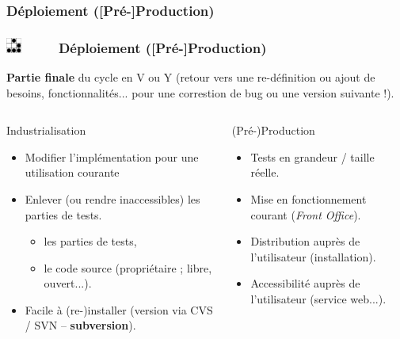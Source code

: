 \documentclass[slidetop,11pt]{beamer}
\def\sectionPartIaTR{D{\'e}ploiement ([Pr{\'e}-]Production)}
\def\moreInFrameTitle{\includegraphics[height=0.5cm]{img/logo_glider.png}~~~~~}
\begin{document}
\subsubsection{\sectionPartIaTR}
\begin{frame}
	\frametitle{\moreInFrameTitle \sectionPartIaTR}
	\textbf{Partie finale} du cycle en V ou Y (retour vers une re-d{\'e}finition ou ajout de besoins, fonctionnalit{\'e}s... pour une correstion de bug ou une version suivante !). 
	
	\begin{columns}[c]
	\begin{column}[c]{6cm}
		\begin{beamerboxesrounded}	[lower=substructureTR, %
		 				 upper=block title TR,%
						 shadow=true]%
		       {Industrialisation}
		        \begin{itemize}
				\item Modifier l'impl{\'e}mentation pour une utilisation courante
				\item Enlever (ou rendre inaccessibles) les parties de tests. 
				\begin{itemize}
					\item les parties de tests, 
					\item le code source (propri{\'e}taire ; libre, ouvert...). 
				\end{itemize}
				\item Facile {\`a} (re-)installer (version via CVS / SVN -- \textbf{subversion}). 
			\end{itemize}
		 \end{beamerboxesrounded}
	\end{column}
	\begin{column}[c]{6cm}
		 \begin{beamerboxesrounded}	[lower=substructureDE, %
		 				 upper=block title DE,%
						 shadow=true]%
		       {(Pr{\'e}-)Production}
		        \begin{itemize}
				\item Tests en grandeur / taille r{\'e}elle. 
				\item Mise en fonctionnement courant (\emph{Front Office}). 
				\item Distribution aupr{\`e}s de l'utilisateur (installation). 
				\item Accessibilit{\'e} aupr{\`e}s de l'utilisateur (service web...). 
			\end{itemize}
		 \end{beamerboxesrounded}
		 
	\end{column}
	\end{columns}
\end{frame}
\end{document}
